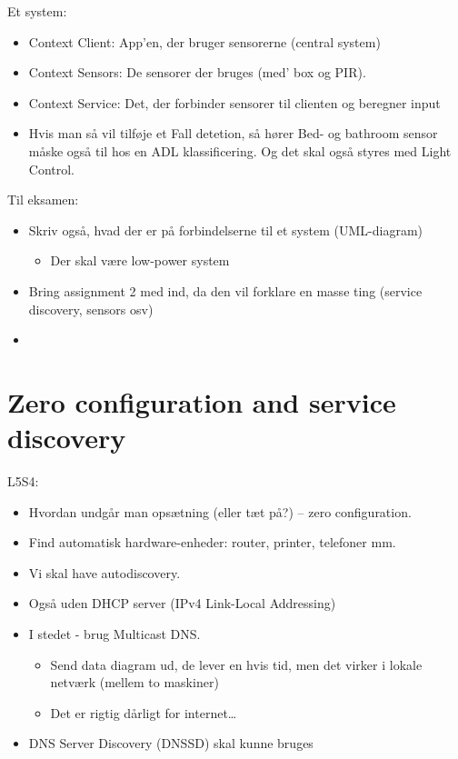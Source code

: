 \documentclass[oneside, 10pt]{article}
\begin{document}
Et system:
\begin{itemize}
	\item Context Client: App'en, der bruger sensorerne (central system)
	\item Context Sensors: De sensorer der bruges (med' box og PIR).
	\item Context Service: Det, der forbinder sensorer til clienten og beregner input
	\item Hvis man så vil tilføje et Fall detetion, så hører Bed- og bathroom sensor måske også til hos en ADL klassificering. Og det skal også styres med Light Control.
\end{itemize}

Til eksamen:
\begin{itemize}
	\item Skriv også, hvad der er på forbindelserne til et system (UML-diagram)
	\begin{itemize}
		\item Der skal være low-power system
	\end{itemize}
	\item Bring assignment 2 med ind, da den vil forklare en masse ting (service discovery, sensors osv)
	\item 
\end{itemize}











\newpage
\section{Zero configuration and service discovery}

L5S4:
\begin{itemize}
	\item Hvordan undgår man opsætning (eller tæt på?) -- zero configuration.
	\item Find automatisk hardware-enheder: router, printer, telefoner mm.
	\item Vi skal have autodiscovery.
	\item Også uden DHCP server (IPv4 Link-Local Addressing)
	\item I stedet - brug Multicast DNS.
	\begin{itemize}
		\item Send data diagram ud, de lever en hvis tid, men det virker i lokale netværk (mellem to maskiner)
		\item Det er rigtig dårligt for internet\dots
	\end{itemize}

	\item DNS Server Discovery (DNSSD) skal kunne bruges
\end{itemize}
\end{document}

